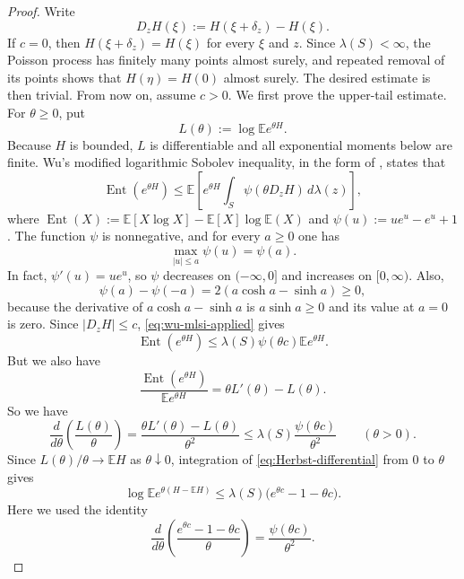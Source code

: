 \documentclass[12pt]{amsart}
\theoremstyle{definition}
\newcommand{\1}{\mathbf 1}
\begin{document}
\begin{proof}
Write
\[
 D_zH(\xi):=H(\xi+\delta_z)-H(\xi).
\]
If $c=0$, then $H(\xi+\delta_z)=H(\xi)$ for every $\xi$ and $z$. Since $\lambda(S)<\infty$, the Poisson process has finitely many points almost surely, and repeated removal of its points shows that $H(\eta)=H(0)$ almost surely. The desired estimate is then trivial. From now on, assume $c>0$. We first prove the upper-tail estimate. For $\theta\geq0$, put
\[
 L(\theta):=\log\mathbb E e^{\theta H}.
\]
Because $H$ is bounded, $L$ is differentiable and all exponential moments below are finite. Wu's modified logarithmic Sobolev inequality, in the form of \cite[Theorem~1.1]{BachmannPeccati}, states that
\begin{equation}\label{eq:wu-mlsi-applied}
 \operatorname{Ent}(e^{\theta H})
 \leq
 \mathbb E\left[e^{\theta H}
 \int_S\psi(\theta D_zH)\,d\lambda(z)\right],
\end{equation}
where $\operatorname{Ent}(X):=\mathbb E[X\log X]-\mathbb E[X]\log\mathbb E(X)$ and $\psi(u):=ue^u-e^u+1$.
The function $\psi$ is nonnegative, and for every $a\geq0$ one has
\[
 \max_{|u|\leq a}\psi(u)=\psi(a).
\]
In fact, $\psi'(u)=ue^u$, so $\psi$ decreases on $(-\infty,0]$ and increases on $[0,\infty)$. Also,
\[
 \psi(a)-\psi(-a)=2(a\cosh a-\sinh a)\geq0,
\]
because the derivative of $a\cosh a-\sinh a$ is $a\sinh a\geq0$ and its value at $a=0$ is zero. Since $|D_zH|\leq c$, \eqref{eq:wu-mlsi-applied} gives
\begin{equation}\label{eq:entropy-bound-poisson}
 \operatorname{Ent}(e^{\theta H})
 \leq \lambda(S)\psi(\theta c)\mathbb E e^{\theta H}.
\end{equation}
But we also have
\[
 \frac{\operatorname{Ent}(e^{\theta H})}{\mathbb E e^{\theta H}}
 =\theta L'(\theta)-L(\theta).
\]
So we have
\begin{equation}\label{eq:Herbst-differential}
 \frac{d}{d\theta}\left(\frac{L(\theta)}{\theta}\right)
 =\frac{\theta L'(\theta)-L(\theta)}{\theta^2}
 \leq\lambda(S)\frac{\psi(\theta c)}{\theta^2}
 \qquad(\theta>0).
\end{equation}
Since $L(\theta)/\theta\to\mathbb EH$ as $\theta\downarrow0$, integration of \eqref{eq:Herbst-differential} from $0$ to $\theta$ gives
\begin{equation}\label{eq:poisson-mgf-bound}
 \log\mathbb E e^{\theta(H-\mathbb EH)}
 \leq\lambda(S)\bigl(e^{\theta c}-1-\theta c\bigr).
\end{equation}
Here we used the identity
\[
 \frac{d}{d\theta}
 \left(\frac{e^{\theta c}-1-\theta c}{\theta}\right)
 =\frac{\psi(\theta c)}{\theta^2}.
\]


\end{proof}
\end{document}
